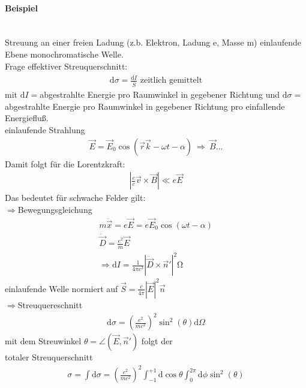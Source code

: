 \documentclass[a4paper]{article}
\begin{document}
\paragraph{Beispiel}~
\\
Streuung an einer freien Ladung (z.b. Elektron, Ladung e, Masse m) einlaufende
Ebene monochromatische Welle.\\
Frage effektiver Streuquerschnitt:
\begin{align}
\mathrm{d}\sigma=\frac{\overline{\mathrm{d}I}}{\overline{S}} \text{  zeitlich
gemittelt}
\end{align}
mit $\mathrm{d}I=$abgestrahlte Energie pro Raumwinkel in gegebener Richtung und
$\mathrm{d}\sigma=$abgestrahlte Energie pro Raumwinkel in gegebener Richtung pro
einfallende Energiefluß.\\
einlaufende Strahlung
\begin{align}
\vec{E}=\vec{E}_0 \cos(\vec{r}\vec{k}-\omega t -\alpha)\ \Rightarrow\ 
\vec{B}\ldots
\end{align}
Damit folgt für die Lorentzkraft:
\begin{align}
\left| \frac{e}{c}\vec{v}\times\vec{B}\right|\ll e\vec{E}
\end{align}
Das bedeutet für schwache Felder gilt:\\
$\Rightarrow$Bewegungsgleichung
\begin{align}
m\ddot{\vec{x}}=e\vec{E}=e\vec{E}_0 \cos(\omega t -\alpha)\\
\ddot{\vec{D}}=\frac{e^2}{m}\vec{E}\\
\Rightarrow \mathrm{d}I=\frac{1}{4\pi c^3}\left|
\ddot{\vec{D}}\times\vec{n}' \right|^2 \mathrm{\Omega}
\end{align}
einlaufende Welle normiert auf $\vec{S}=\frac{c}{4\pi}|\vec{E}|^2\vec{n}$\\
$\Rightarrow$Streuquereschnitt\\
\begin{align}
\mathrm{d}\sigma = \left(\frac{e^2}{mc^2} \right)^2 \sin^2(\theta)
\mathrm{d}\Omega
\end{align}
mit dem Streuwinkel $\theta=\angle(\vec{E},\vec{n}')$ folgt der\\
totaler Streuquerschnitt
\begin{align}
\sigma=\int\mathrm{d}\sigma=\left(\frac{e^2}{mc^2} \right)^2\int_{-1}^{+1}
\mathrm{d}\cos\theta \int_0^{2\pi}\mathrm{d}\phi \sin^2(\theta)
\end{align}
\end{document}
